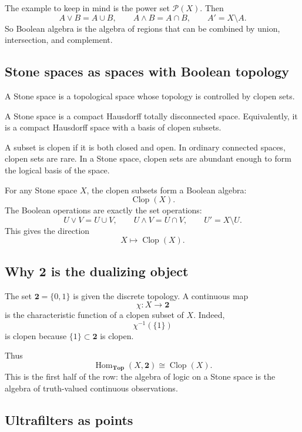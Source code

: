 The example to keep in mind is the power set \(\mathcal P(X)\).  Then
\[
  A\vee B=A\cup B,
  \qquad
  A\wedge B=A\cap B,
  \qquad
  A'=X\setminus A.
\]
So Boolean algebra is the algebra of regions that can be combined by union, intersection, and complement.

\subsection{Stone spaces as spaces with Boolean topology}

A Stone space is a topological space whose topology is controlled by clopen sets.

\begin{definition}
A Stone space is a compact Hausdorff totally disconnected space.  Equivalently, it is a compact Hausdorff space with a basis of clopen subsets.
\end{definition}

A subset is clopen if it is both closed and open.  In ordinary connected spaces, clopen sets are rare.  In a Stone space, clopen sets are abundant enough to form the logical basis of the space.

For any Stone space \(X\), the clopen subsets form a Boolean algebra:
\[
  \operatorname{Clop}(X).
\]
The Boolean operations are exactly the set operations:
\[
  U\vee V=U\cup V,
  \qquad
  U\wedge V=U\cap V,
  \qquad
  U'=X\setminus U.
\]
This gives the direction
\[
  X\longmapsto \operatorname{Clop}(X).
\]

\subsection{Why \(\mathbf 2\) is the dualizing object}

The set \(\mathbf 2=\{0,1\}\) is given the discrete topology.  A continuous map
\[
  \chi:X\to \mathbf 2
\]
is the characteristic function of a clopen subset of \(X\).  Indeed,
\[
  \chi^{-1}(\{1\})
\]
is clopen because \(\{1\}\subset \mathbf 2\) is clopen.

Thus
\[
  \operatorname{Hom}_{\mathbf{Top}}(X,\mathbf 2)\cong \operatorname{Clop}(X).
\]
This is the first half of the row: the algebra of logic on a Stone space is the algebra of truth-valued continuous observations.

\subsection{Ultrafilters as points}

